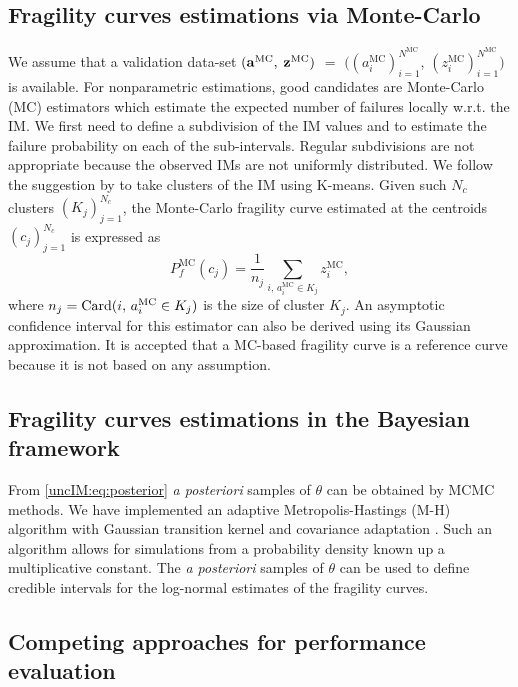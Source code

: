     \subsection{Fragility curves estimations via Monte-Carlo}
     \label{uncIM:sec:reference}
        We assume that a validation data-set $(\mathbf{a}^{\mathrm{MC}},$ $\mathbf{z}^{\mathrm{MC}})$ $ =$ $ ( (a_i^{\mathrm{MC}})_{i=1}^{N^{\mathrm{MC}}} $, $(z_i^{\mathrm{MC}})_{i=1}^{N^{\mathrm{MC}}})$ is available. For nonparametric estimations, good candidates are Monte-Carlo (MC) estimators which estimate the expected number of failures locally w.r.t. the IM. We first need to define a subdivision of the IM values and to estimate the failure probability on each of the sub-intervals. Regular subdivisions are not appropriate because the observed IMs are not uniformly distributed. We follow the suggestion by \citet{trevlopoulos_parametric_2019} to take clusters of the IM using K-means. 
        Given such $N_c$ clusters $(K_j)_{j=1}^{N_c}$, the Monte-Carlo fragility curve estimated at the centroids $(c_j)_{j=1}^{N_c}$ is expressed as
            \begin{equation} \label{uncIM:eq:refMC}
                P_f^{\mathrm{MC}}(c_j) = \frac{1}{n_j}\sum_{i,\,a_i^{\mathrm{MC}}\in K_j}z_i^{\mathrm{MC}}  , 
            \end{equation}
        where $n_j = {\rm Card}(i,\,a_i^{\mathrm{MC}}\in K_j)$ is the size of cluster $K_j$.
        An asymptotic confidence interval for this estimator can also be derived using its Gaussian approximation. It is accepted that a MC-based fragility curve is a reference curve because it is not based on any assumption.

    \subsection{Fragility curves estimations in the Bayesian framework}  \label{uncIM:sec:BayesFram}
        From \cref{uncIM:eq:posterior} \emph{a posteriori} samples of $\theta$ can be obtained by MCMC methods. We have implemented an adaptive Metropolis-Hastings (M-H) algorithm with Gaussian transition kernel and covariance adaptation \citep{haario_adaptive_2001}. Such an algorithm allows for simulations from a probability density known up a multiplicative constant. The \emph{a posteriori} samples of $\theta$ can be used to define credible intervals for the log-normal estimates of the fragility curves.

    \subsection{Competing approaches for performance evaluation} \label{uncIM:sec:Competing}
    
